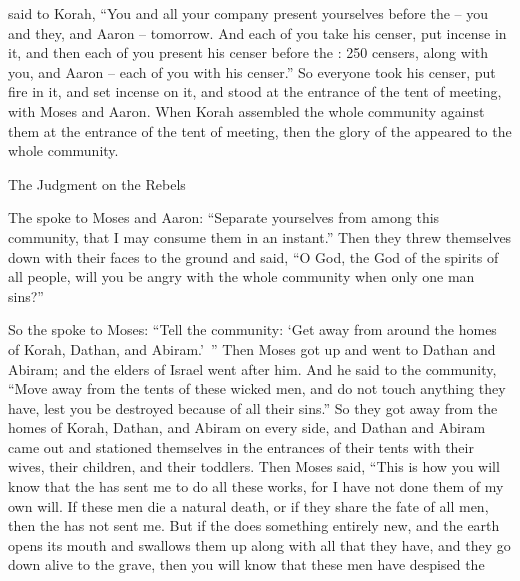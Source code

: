 {said to
Korah,
“You
and all
your company
present yourselves
before
the {} –
you
and they,
and Aaron
– tomorrow.
And each
of you take
his censer,
put
incense
in it, and then each
of you present
his censer
before
the {}: 250
censers,
along with you,
and Aaron
– each
of you with his censer.”
So everyone
took
his censer,
put
fire
in it, and set
incense
on
it, and stood
at the entrance
of the tent
of meeting,
with Moses
and Aaron.
When Korah
assembled
the whole
community
against
them
at the entrance
of the tent
of meeting,
then the glory
of the {}
appeared
to
the whole
community.
\par }{\SH The Judgment on the Rebels
\par }{\PP {}The
{}
spoke
to
Moses
and Aaron:
“Separate
yourselves from among
this
community,
that I may consume
them in an instant.”
Then they threw
themselves down with their faces
to the ground and said,
“O God,
the God
of the spirits
of all
people,
will you be angry
with the whole
community
when only one
man
sins?”
\par }{\PP {}So the
{}
spoke
to
Moses:
“Tell
the community: ‘Get away
from around
the homes
of Korah,
Dathan,
and Abiram.’ ”
Then Moses
got up
and went
to
Dathan
and Abiram;
and the elders
of Israel
went
after him.
And he said
to
the community,
“Move
away from the tents
of these
wicked
men,
and do not
touch
anything
they have,
lest
you be destroyed
because of all
their sins.”
So
they got away
from the homes
of Korah,
Dathan,
and Abiram
on every side,
and Dathan
and Abiram
came out
and stationed
themselves in the entrances
of their tents
with their wives,
their children,
and their toddlers.
Then Moses
said,
“This
is how you will know
that
the {}
has sent
me to do
all
these
works,
for
I have not done them of my own will.
If
these
men
die
a natural death,
or if they share
the fate
of all
men,
then the
{}
has not
sent me.
But if
the {}
does something entirely new,
and the earth
opens
its mouth
and swallows
them up along
with all
that
they have, and they go down
alive
to the grave,
then you will know
that
these
men
have despised
the

}
